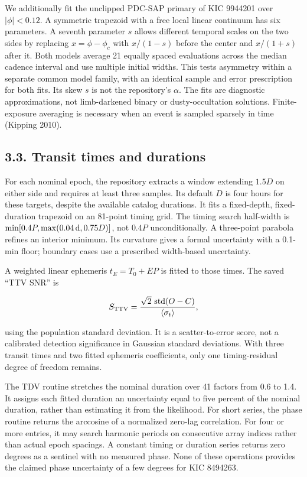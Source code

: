 \documentclass[
  english,
]{article}
\begin{document}
We additionally fit the unclipped PDC-SAP primary of KIC 9944201 over
\(|\phi|<0.12\). A symmetric trapezoid with a free local linear
continuum has six parameters. A seventh parameter \(s\) allows different
temporal scales on the two sides by replacing \(x=\phi-\phi_c\) with
\(x/(1-s)\) before the center and \(x/(1+s)\) after it. Both models
average 21 equally spaced evaluations across the median cadence interval
and use multiple initial widths. This tests asymmetry within a separate
common model family, with an identical sample and error prescription for
both fits. Its skew \(s\) is not the repository's \(\alpha\). The fits
are diagnostic approximations, not limb-darkened binary or
dusty-occultation solutions. Finite-exposure averaging is necessary when
an event is sampled sparsely in time (Kipping 2010).

\subsection{3.3. Transit times and
durations}\label{transit-times-and-durations}

For each nominal epoch, the repository extracts a window extending
\(1.5D\) on either side and requires at least three samples. Its default
\(D\) is four hours for these targets, despite the available catalog
durations. It fits a fixed-depth, fixed-duration trapezoid on an
81-point timing grid. The timing search half-width is
\(\min[0.4P,\max(0.04\,{\rm d},0.75D)]\), not \(0.4P\) unconditionally.
A three-point parabola refines an interior minimum. Its curvature gives
a formal uncertainty with a 0.1-min floor; boundary cases use a
prescribed width-based uncertainty.

A weighted linear ephemeris \(t_E=T_0+EP\) is fitted to those times. The
saved ``TTV SNR'' is

\[
S_{\rm TTV}=\frac{\sqrt{2}\,\operatorname{std}(O-C)}{\langle\sigma_t\rangle},
\]

using the population standard deviation. It is a scatter-to-error score,
not a calibrated detection significance in Gaussian standard deviations.
With three transit times and two fitted ephemeris coefficients, only one
timing-residual degree of freedom remains.

The TDV routine stretches the nominal duration over 41 factors from 0.6
to 1.4. It assigns each fitted duration an uncertainty equal to five
percent of the nominal duration, rather than estimating it from the
likelihood. For short series, the phase routine returns the arccosine of
a normalized zero-lag correlation. For four or more entries, it may
search harmonic periods on consecutive array indices rather than actual
epoch spacings. A constant timing or duration series returns zero
degrees as a sentinel with no measured phase. None of these operations
provides the claimed phase uncertainty of a few degrees for KIC 8494263.
\end{document}
